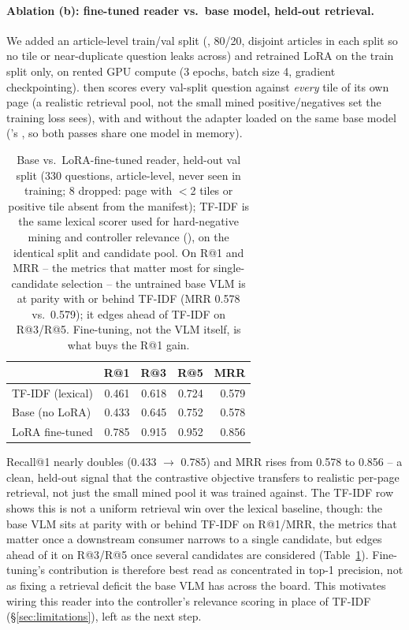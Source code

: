 \paragraph{Ablation (b): fine-tuned reader vs.\ base model, held-out retrieval.} We added an article-level train/val split (, 80/20, disjoint articles in each split so no tile or near-duplicate question leaks across) and retrained LoRA on the train split only, on rented GPU compute (3 epochs, batch size 4, gradient checkpointing).  then scores every val-split question against \emph{every} tile of its own page (a realistic retrieval pool, not the small mined positive/negatives set the training loss sees), with and without the adapter loaded on the same base model ('s , so both passes share one model in memory).

\begin{table}[t]
\centering
\small
\begin{tabular}{@{}lrrrr@{}}
\toprule
 & R@1 & R@3 & R@5 & MRR \\
\midrule
TF-IDF (lexical) & 0.461 & 0.618 & 0.724 & 0.579 \\
Base (no LoRA) & 0.433 & 0.645 & 0.752 & 0.578 \\
LoRA fine-tuned & 0.785 & 0.915 & 0.952 & 0.856 \\
\bottomrule
\end{tabular}
\caption{Base vs.\ LoRA-fine-tuned reader, held-out val split (330 questions, article-level, never seen in training; 8 dropped: page with $<$2 tiles or positive tile absent from the manifest); TF-IDF is the same lexical scorer used for hard-negative mining and controller relevance (), on the identical split and candidate pool. On R@1 and MRR -- the metrics that matter most for single-candidate selection -- the untrained base VLM is at parity with or behind TF-IDF (MRR 0.578 vs.\ 0.579); it edges ahead of TF-IDF on R@3/R@5. Fine-tuning, not the VLM itself, is what buys the R@1 gain.}
\label{tab:reader-ablation}
\end{table}

Recall@1 nearly doubles (0.433 $\to$ 0.785) and MRR rises from 0.578 to 0.856 -- a clean, held-out signal that the contrastive objective transfers to realistic per-page retrieval, not just the small mined pool it was trained against. The TF-IDF row shows this is not a uniform retrieval win over the lexical baseline, though: the base VLM sits at parity with or behind TF-IDF on R@1/MRR, the metrics that matter once a downstream consumer narrows to a single candidate, but edges ahead of it on R@3/R@5 once several candidates are considered (Table~\ref{tab:reader-ablation}). Fine-tuning's contribution is therefore best read as concentrated in top-1 precision, not as fixing a retrieval deficit the base VLM has across the board. This motivates wiring this reader into the controller's relevance scoring in place of TF-IDF (\S\ref{sec:limitations}), left as the next step.

